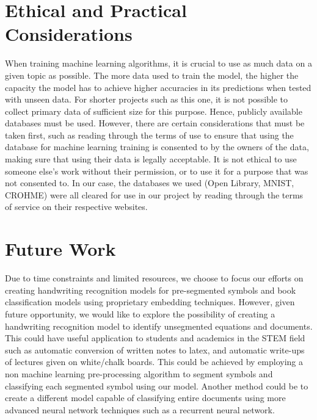 \documentclass[twocolumn,pra,floatfix]{revtex4-2}
\begin{document}
     \section{Ethical and Practical Considerations}

        When training machine learning algorithms, it is crucial to use as much data on a given topic as possible. The more data used to train the model, the higher the capacity the model has to achieve higher accuracies in its predictions when tested with unseen data. For shorter projects such as this one, it is not possible to collect primary data of sufficient size for this purpose. Hence, publicly available databases must be used. However, there are certain considerations that must be taken first, such as reading through the terms of use to ensure that using the database for machine learning training is consented to by the owners of the data, making sure that using their data is legally acceptable. It is not ethical to use someone else's work without their permission, or to use it for a purpose that was not consented to. In our case,  the databases we used (Open Library, MNIST, CROHME) were all cleared for use in our project by reading through the terms of service on their respective websites. 


    \section{Future Work}

        Due to time constraints and limited resources, we choose to focus our efforts on creating handwriting recognition models for pre-segmented symbols and book classification models using proprietary embedding techniques. However, given future opportunity, we would like to explore the possibility of creating a handwriting recognition model to identify unsegmented equations and documents.
        This could have useful application to students and academics in the STEM field such as automatic conversion of written notes to latex, and automatic write-ups of lectures given on white/chalk boards. This could be achieved by employing a non machine learning pre-processing algorithm to segment symbols and classifying each segmented symbol using our model. Another method could be to create a different model capable of classifying entire documents using more advanced neural network techniques such as a recurrent neural network.
\end{document}
